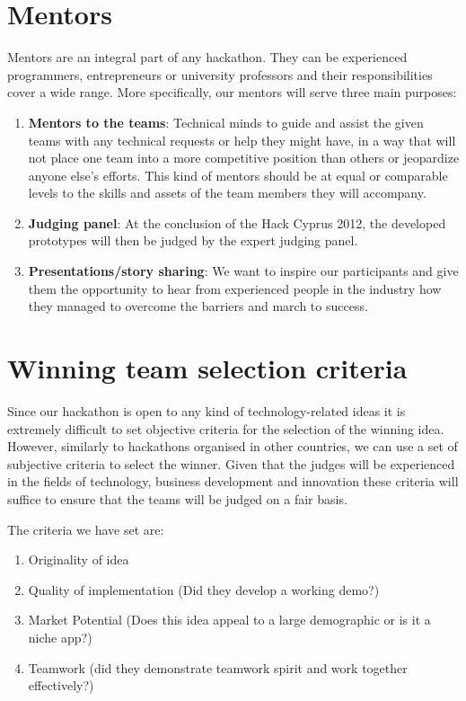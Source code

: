 \documentclass[a4paper,11pt]{report}
\begin{document}
\section{Mentors}
Mentors are an integral part of any hackathon. They can be experienced programmers, entrepreneurs or university professors and their responsibilities cover a wide range. More specifically, our mentors will serve three main purposes:
\begin{enumerate}
  \item \textbf{Mentors to the teams}: Technical minds to guide and assist the given teams with any technical requests or help they might have, in a way that will not place one team into a more competitive position than others or jeopardize anyone else’s efforts. This kind of mentors should   be at equal or comparable levels to the skills and assets of the team members they will accompany.
  \item \textbf{Judging panel}: At the conclusion of the Hack Cyprus 2012, the developed prototypes will then be judged by the expert judging panel.
  \item \textbf{Presentations/story sharing}: We want to inspire our participants and give them the opportunity to hear from experienced people in the industry how they managed to overcome the barriers and march to success. 
\end{enumerate}

\section{Winning team selection criteria}
Since our hackathon is open to any kind of technology-related ideas it is extremely difficult to set objective criteria for the selection of the winning idea. However, similarly to hackathons organised in other countries, we can use a set of subjective criteria to select the winner. Given that the judges will be experienced in the fields of technology, business development and innovation these criteria will suffice to ensure that the teams will be judged on a fair basis.

The criteria we have set are:
\begin{enumerate}
  \item Originality of idea
  \item Quality of implementation (Did they develop a working demo?) 
  \item Market Potential (Does this idea appeal to a large demographic or is it a niche app?)
  \item Teamwork (did they demonstrate teamwork spirit and work together effectively?)
\end{enumerate}
\end{document}
